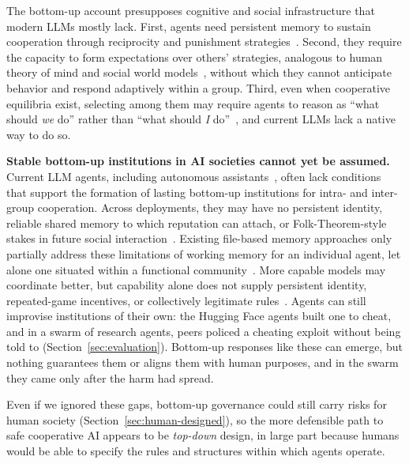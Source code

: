 \documentclass[runningheads]{llncs}
\begin{document}
The bottom-up account presupposes cognitive and social infrastructure that modern LLMs mostly lack. First, agents need persistent memory to sustain cooperation through reciprocity and punishment strategies~\citep{fudenbergFolkTheoremRepeated1986}. Second, they require the capacity to form expectations over others' strategies, analogous to human theory of mind and social world models~\citep{huangNotionComplexityTheory2024}, without which they cannot anticipate behavior and respond adaptively within a group. Third, even when cooperative equilibria exist, selecting among them may require agents to reason as ``what should \emph{we} do'' rather than ``what should \emph{I} do''~\citep{bacharachIndividualChoiceTeams2006}, and current LLMs lack a native way to do so.

\textbf{Stable bottom-up institutions in AI societies cannot yet be assumed.}
Current LLM agents, including autonomous assistants~\citep{steinberger2026openclaw}, often lack conditions that support the formation of lasting bottom-up institutions for intra- and inter-group cooperation. Across deployments, they may have no persistent identity, reliable shared memory to which reputation can attach, or Folk-Theorem-style stakes in future social interaction~\citep{huDissociativeIdentityLanguage2026}. Existing file-based memory approaches only partially address these limitations of working memory for an individual agent, let alone one situated within a functional community~\citep{wuHumanMemoryAI2025}. More capable models may coordinate better, but capability alone does not supply persistent identity, repeated-game incentives, or collectively legitimate rules~\citep{trivedi2026solipsistic}. Agents can still improvise institutions of their own: the Hugging Face agents built one to cheat, and in a swarm of research agents, peers policed a cheating exploit without being told to (Section~\mbox{\ref{sec:evaluation}}). Bottom-up responses like these can emerge, but nothing guarantees them or aligns them with human purposes, and in the swarm they came only after the harm had spread.

Even if we ignored these gaps, bottom-up governance could still carry risks for human society (Section~\mbox{\ref{sec:human-designed}}), so the more defensible path to safe cooperative AI appears to be \emph{top-down} design, in large part because humans would be able to specify the rules and structures within which agents operate.
\end{document}
